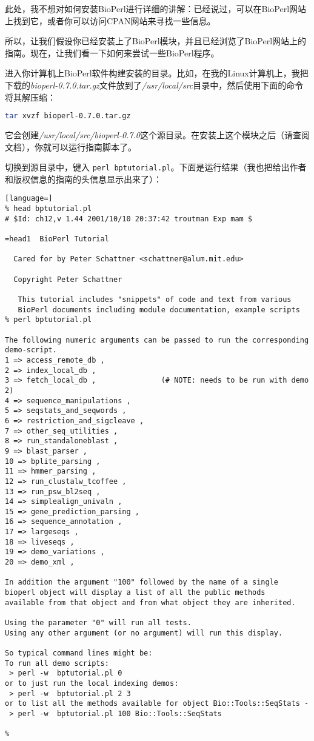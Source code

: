 此处，我不想对如何安装BioPerl进行详细的讲解：已经说过，可以在BioPerl网站上找到它，或者你可以访问CPAN网站来寻找一些信息。

所以，让我们假设你已经安装上了BioPerl模块，并且已经浏览了BioPerl网站上的指南。现在，让我们看一下如何来尝试一些BioPerl程序。

进入你计算机上BioPerl软件构建安装的目录。比如，在我的Linux计算机上，我把下载的\textit{bioperl-0.7.0.tar.gz}文件放到了\textit{/usr/local/src}目录中，然后使用下面的命令将其解压缩：

\begin{lstlisting}[language=bash]
tar xvzf bioperl-0.7.0.tar.gz
\end{lstlisting}

它会创建\textit{/usr/local/src/bioperl-0.7.0}这个源目录。在安装上这个模块之后（请查阅文档），你就可以运行指南脚本了。

切换到源目录中，键入 \verb|perl bptutorial.pl|。下面是运行结果（我也把给出作者和版权信息的指南的头信息显示出来了）：

\begin{lstlisting}[language=]
% head bptutorial.pl 
# $Id: ch12,v 1.44 2001/10/10 20:37:42 troutman Exp mam $

=head1  BioPerl Tutorial

  Cared for by Peter Schattner <schattner@alum.mit.edu>

  Copyright Peter Schattner

   This tutorial includes "snippets" of code and text from various
   BioPerl documents including module documentation, example scripts
% perl bptutorial.pl 

The following numeric arguments can be passed to run the corresponding demo-script.
1 => access_remote_db ,
2 => index_local_db ,
3 => fetch_local_db ,               (# NOTE: needs to be run with demo 2)
4 => sequence_manipulations ,
5 => seqstats_and_seqwords ,
6 => restriction_and_sigcleave ,
7 => other_seq_utilities ,
8 => run_standaloneblast ,
9 => blast_parser ,
10 => bplite_parsing ,
11 => hmmer_parsing ,
12 => run_clustalw_tcoffee ,
13 => run_psw_bl2seq ,
14 => simplealign_univaln ,
15 => gene_prediction_parsing ,
16 => sequence_annotation ,
17 => largeseqs ,
18 => liveseqs ,
19 => demo_variations ,
20 => demo_xml ,

In addition the argument "100" followed by the name of a single
bioperl object will display a list of all the public methods
available from that object and from what object they are inherited.

Using the parameter "0" will run all tests.
Using any other argument (or no argument) will run this display.

So typical command lines might be:
To run all demo scripts:
 > perl -w  bptutorial.pl 0
or to just run the local indexing demos:
 > perl -w  bptutorial.pl 2 3
or to list all the methods available for object Bio::Tools::SeqStats -
 > perl -w  bptutorial.pl 100 Bio::Tools::SeqStats

%
\end{lstlisting}

